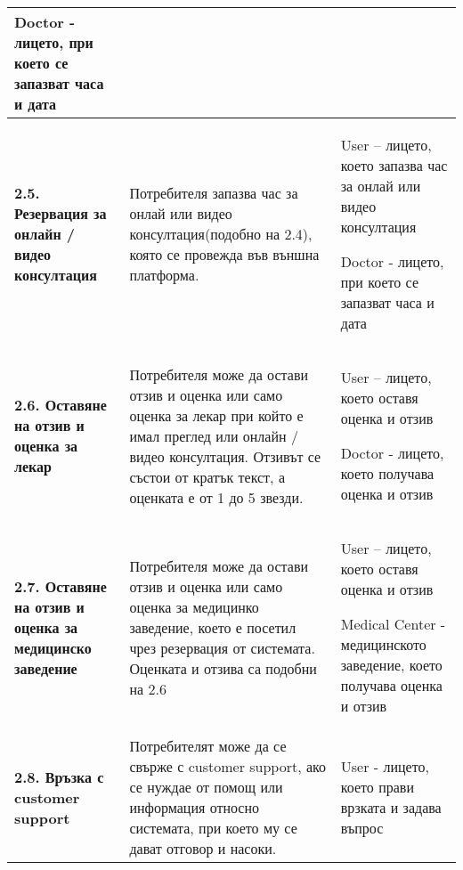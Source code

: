 \documentclass[a4paper,12pt]{article}
\begin{document}
\begin{xltabular}{\textwidth}{|p{4cm}|p{6cm}|p{6cm}|}
Doctor - лицето, при което се запазват часа и дата \\
\hline
{}\textbf{2.5. Резервация за онлайн / видео консултация} &
Потребителя запазва час за онлай или видео консултация(подобно на 2.4), която се провежда във външна платформа. &
User –  лицето, което запазва час за  онлай или видео консултация

Doctor - лицето, при което се запазват часа и дата \\
\hline
{}\textbf{2.6. Оставяне на отзив и оценка за лекар} &
Потребителя може да остави отзив и оценка или само оценка за лекар при който е имал преглед или онлайн / видео консултация. Отзивът се състои от кратък текст, а оценката е от 1 до 5 звезди. &
User – лицето, което оставя оценка и отзив

Doctor - лицето, което получава оценка и отзив \\
\hline
{}\textbf{2.7. Оставяне на отзив и оценка за медицинско заведение} &
Потребителя може да остави отзив и оценка или само оценка за медицинко заведение, което е посетил чрез резервация от системата. Оценката и отзива са подобни на 2.6 &
User – лицето, което оставя оценка и отзив

Medical Center - медицинското заведение, което получава оценка и отзив \\
\hline
\hline
{}\textbf{2.8. Връзка с customer support} &
Потребителят може да се свърже с customer support, ако се нуждае от помощ или информация относно системата, при което му се дават отговор и насоки. &
User - лицето, което прави врзката и задава въпрос


\end{xltabular}
\end{document}
